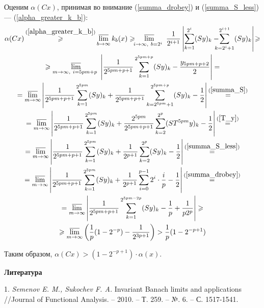 Оценим $\alpha(Cx)$, принимая во внимание (\ref{summa_drobey}) и (\ref{summa_S_less}) --- (\ref{alpha_greater_k_b}):
\begin{multline*}
	\alpha (Cx) \mathop{\geqslant}^{(\ref{alpha_greater_k_b})}
	\varlimsup_{b\to \infty} k_b(x) \geqslant
	\!\!\!
	\varlimsup_{
		i\to \infty,~
		b=2^i~
	}\frac{1}{2^{i+1}}\left|
		\sum_{k=1}^{2^i}(Sy)_k -
		\!\!\!\!\!
		\sum_{k=2^i+1}^{2^{i+1}}(Sy)_k
	\right|
	\!
	\geqslant
	\\ \geqslant
	\varlimsup_{
		m\to \infty,~
		i=5pm+p~
	}\left|
		\frac{1}{2^{5pm+p+1}}\sum_{k=1}^{2^{5pm+p}}(Sy)_k - \frac{y_{5pm+p+2}}{2}
	\right| =
	\\=
	\varlimsup_{m\to \infty}\left|
		\frac{1}{2^{5pm+p+1}}\sum_{k=1}^{2^{5pm}}(Sy)_k
		+
		\frac{1}{2^{5pm+p+1}}\sum_{k=2^{5pm}+1}^{2^{5pm+p}}(Sy)_k
		- \frac{1}{2}
	\right|
	\mathop{=}^{(\ref{summa_S})}
	\\=
	\varlimsup_{m\to \infty}\left|
		\frac{1}{2^{5pm+p+1}}\sum_{k=1}^{2^{5pm}}(Sy)_k
		+
		\frac{2^{5pm}}{2^{5pm+p+1}} \sum_{k=2}^{2^p}(ST^{5pm}y)_k
		- \frac{1}{2}
	\right|
	\mathop{=}^{(\ref{T_y})}
	\\=
	\varlimsup_{m\to \infty}\left|
		\frac{1}{2^{5pm+p+1}}\sum_{k=1}^{2^{5pm}}(Sy)_k
		+
		\frac{1}{2^{p+1}} \sum_{k=2}^{2^p}(Sy)_k
		- \frac{1}{2}
	\right|
	\mathop{=}^{(\ref{summa_S_less})}
	\\=
	\varlimsup_{m\to \infty}\left|
		\frac{1}{2^{5pm+p+1}}\sum_{k=1}^{2^{5pm}}(Sy)_k
		+
		\frac{1}{2^{p+1}} \sum_{i=0}^{p-1}2^i \cdot \frac{i}{p}
		- \frac{1}{2}
	\right|
	\mathop{=}^{(\ref{summa_drobey})}
	\\=
	\varlimsup_{m\to \infty}\left|
		\frac{1}{2^{5pm+p+1}}\sum_{k=1}^{2^{5pm-2p}}(Sy)_k
		-\frac{1}{p} + \frac{1}{p 2^p}
	\right| \geqslant
	\\ \geqslant
	\varlimsup_{m\to \infty} \left(
		\frac{1}{p} (1-2^{-p})
		- \frac{1}{2^{3p+1}}
	\right) >
	\frac{1}{p} (1-2^{-p+1})
\end{multline*}


Таким образом,
$
	\alpha(Cx) >
	(1-2^{-p+1}) \cdot \alpha(x)
$.

\smallskip \centerline{\bf Литература}\nopagebreak

1. {\it Semenov E. M., Sukochev F. A.}
 Invariant Banach limits and applications //Journal of Functional Analysis. – 2010. – Т. 259. – №. 6. – С. 1517-1541.
